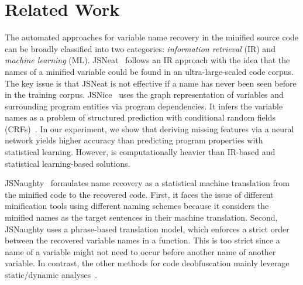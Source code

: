 \section{Related Work}
\label{related_section}

The automated approaches for variable name recovery in the minified
source code can be broadly classified into two categories: {\em
  information retrieval} (IR) and {\em machine learning} (ML).
JSNeat~\cite{icse19} follows an IR approach with the idea that the
names of a minified variable could be found in an ultra-large-scaled
code corpus. The key issue is that JSNeat is not effective if a name
has never been seen before in the training
corpus. JSNice~\cite{JSNice2015} uses the graph representation of
variables and surrounding program entities via program
dependencies. It infers the variable names as a problem of structured
prediction with conditional random fields (CRFs)~\cite{JSNice2015}.
In our experiment, we show that deriving missing features via a neural
network yields higher accuracy than predicting program properties with
statistical learning. However, {\tool} is computationally heavier than
IR-based and statistical learning-based solutions.

JSNaughty~\cite{JSNaughty2017} formulates name recovery as a
statistical machine translation from the minified code to the
recovered code. First, it faces the issue of different minification
tools using different naming schemes because it considers the minified
names as the target sentences in their machine translation.  Second,
JSNaughty uses a phrase-based translation model, which enforces a
strict order between the recovered variable names in a function. This
is too strict since a name of a variable might not need to occur
before another name of another variable.  In contrast, the other
methods for code deobfuscation mainly leverage static/dynamic
analyses~\cite{Christodorescu:2003:SAE:1251353.1251365,Moser:2007:EME:1263552.1264210,Udupa05deobfuscation:reverse}.


